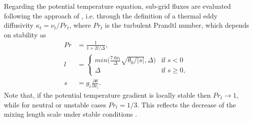Regarding the potential temperature equation, sub-grid fluxes are evaluated following the approach of \cite{Moeng1984}, i.e. through the definition of a thermal eddy diffusivity $\kappa_t = \nu_t/Pr_t$, where $Pr_t$ is the turbulent Prandtl number, which depends on stability as
\begin{align}
	\mathit{Pr} &= \frac{1}{1+2l/\Delta} , \label{eq:Prt} \\
	\mathit{l}  &= \begin{cases} 
		\mathit{\text{min}\big(\frac{7.6\nu_t}{\Delta}\sqrt{\theta_{0}/|s|}, \Delta\big)} & \mbox{if } s< 0 \\[18pt]
		\Delta                                                            & \mbox{if } s \ge 0,
	\end{cases} \nonumber\\ 
	\mathit{s} &= g_{i} \frac{\partial \theta}{\partial x_i}. \nonumber
\end{align}
Note that, if the potential temperature gradient is locally stable then $Pr_t\rightarrow1$, while for neutral or unstable cases $Pr_t = 1/3$. This reflects the decrease of the mixing length scale under stable conditions \citep{Shumann1991}.

